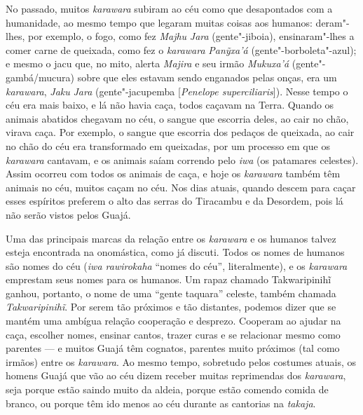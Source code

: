 No passado, muitos \emph{karawara} subiram ao céu como que desapontados
com a humanidade, ao mesmo tempo que legaram muitas coisas aos humanos:
deram"-lhes, por exemplo, o fogo, como fez \emph{Majhu} \emph{Jara}
(gente"-jiboia), ensinaram"-lhes a comer carne de queixada, como fez o
\emph{karawara} \emph{Panỹxa'á} (gente"-borboleta"-azul); e mesmo o jacu
que, no mito, alerta \emph{Majira} e seu irmão \emph{Mukuxa'á}
(gente"-gambá/mucura) sobre que eles estavam sendo enganados pelas onças,
era um \emph{karawara}, \emph{Jaku} \emph{Jara} (gente"-jacupemba
{[}\emph{Penelope superciliaris}{]}). Nesse tempo o céu era mais baixo,
e lá não havia caça, todos caçavam na Terra. Quando os animais abatidos
chegavam no céu, o sangue que escorria deles, ao cair no chão, virava
caça. Por exemplo, o sangue que escorria dos pedaços de queixada, ao
cair no chão do céu era transformado em queixadas, por um processo em
que os \emph{karawara} cantavam, e os animais saíam correndo pelo
\emph{iwa} (os patamares celestes). Assim ocorreu com todos os animais
de caça, e hoje os \emph{karawara} também têm animais no céu, muitos
caçam no céu. Nos dias atuais, quando descem para caçar esses espíritos
preferem o alto das serras do Tiracambu e da Desordem, pois lá não serão
vistos pelos Guajá.

Uma das principais marcas da relação entre os \emph{karawara} e os
humanos talvez esteja encontrada na onomástica, como já discuti. Todos
os nomes de humanos são nomes do céu (\emph{iwa rawirokaha} ``nomes do
céu'', literalmente), e os \emph{karawara} emprestam seus nomes para os
humanos. Um rapaz chamado Takwaripinihĩ ganhou, portanto, o nome de uma
``gente taquara'' celeste, também chamada \emph{Takwaripinihĩ}. Por
serem tão próximos e tão distantes, podemos dizer que se mantém uma
ambígua relação cooperação e desprezo. Cooperam ao ajudar na caça,
escolher nomes, ensinar cantos, trazer curas e se relacionar mesmo como
parentes --- e muitos Guajá têm cognatos, parentes muito próximos (tal
como irmãos) entre os \emph{karawara}. Ao mesmo tempo, sobretudo pelos
costumes atuais, os homens Guajá que vão ao céu dizem receber muitas
reprimendas dos \emph{karawara}, seja porque estão saindo muito da
aldeia, porque estão comendo comida de branco, ou porque têm ido menos
ao céu durante as cantorias na \emph{takaja}.

